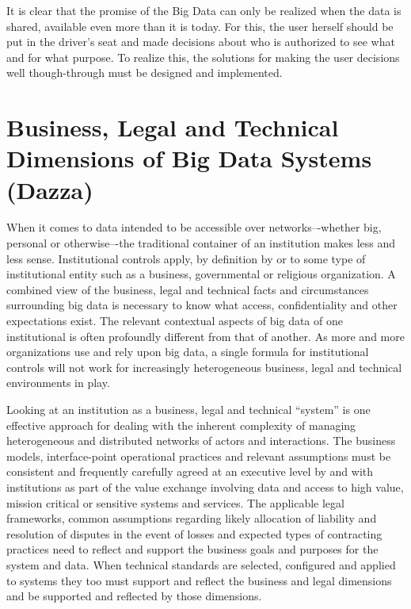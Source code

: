 It is clear that the promise of the Big Data can only be realized when the data is shared, available even more than it is today.
For this, the user herself should be put in the driver's seat and made decisions about who is authorized to see what and for what purpose.
To realize this, the solutions for making the user decisions well though-through must be designed and implemented.



\section{Business, Legal and Technical Dimensions of Big Data Systems (Dazza)}

When it comes to data intended to be accessible over networks–-whether big, personal or otherwise–-the traditional container of an institution makes less and less sense.
Institutional controls apply, by definition by or to some type of institutional entity such as a business, governmental or religious organization.
A combined view of the business, legal and technical facts and circumstances surrounding big data is necessary to know what access, confidentiality and other expectations exist.
The relevant contextual aspects of big data of one institutional is often profoundly different from that of another.
As more and more organizations use and rely upon big data, a single formula for institutional controls will not work for increasingly heterogeneous business, legal and technical environments in play.

Looking at an institution as a business, legal and technical “system” is one effective approach for dealing with the inherent complexity of managing heterogeneous and distributed networks of actors and interactions.
The business models, interface-point operational practices and relevant assumptions must be consistent and frequently carefully agreed at an executive level by and with institutions as part of the value exchange involving data and access to high value, mission critical or sensitive systems and services.
The applicable legal frameworks, common assumptions regarding likely allocation of liability and resolution of disputes in the event of losses and expected types of contracting practices need to reflect and support the business goals and purposes for the system and data.
When technical standards are selected, configured and applied to systems they too must support and reflect the business and legal dimensions and be supported and reflected by those dimensions.

